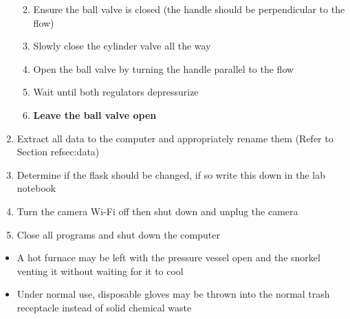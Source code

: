 \begin{enumerate}
  \begin{enumerate}
  \def\labelenumii{\arabic{enumii}.}
  \tightlist
  \item
    Ensure the ball valve is closed (the handle should be perpendicular
    to the flow)
  \item
    Slowly close the cylinder valve all the way
  \item
    Open the ball valve by turning the handle parallel to the flow
  \item
    Wait until both regulators depressurize
  \item
    \textbf{Leave the ball valve open}
  \end{enumerate}
\item
  Extract all data to the computer and appropriately rename them (Refer
  to Section refsec:data)
\item
  Determine if the flask should be changed, if so write this down in the
  lab notebook
\item
  Turn the camera Wi-Fi off then shut down and unplug the camera
\item
  Close all programs and shut down the computer
\end{enumerate}

\begin{itemize}
\tightlist
\item
  A hot furnace may be left with the pressure vessel open and the
  snorkel venting it without waiting for it to cool
\item
  Under normal use, disposable gloves may be thrown into the normal
  trash receptacle instead of solid chemical waste
\end{itemize}
